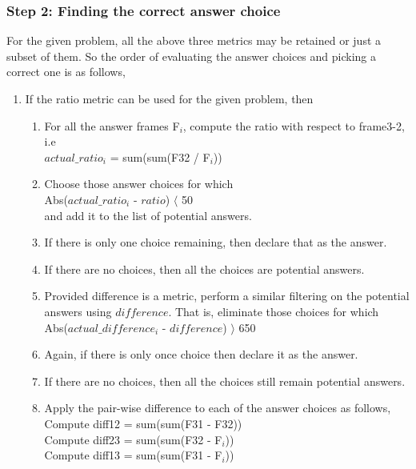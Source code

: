 \documentclass[10pt, letter]{article}
\begin{document}
\subsubsection*{Step 2: Finding the correct answer choice}
For the given problem, all the above three metrics may be retained or just a subset of them. So the order of evaluating the answer choices and picking a correct one is as follows,
\begin{enumerate}
\item If the ratio metric can be used for the given problem, then
	\begin{enumerate}
		\item For all the answer frames F$_i$, compute the ratio with respect to frame3-2, i.e \\
		\hspace*{3cm} $actual\_ratio_i$ = sum(sum(F32 / F$_i$)) 
		\item Choose those answer choices for which \\
		\hspace*{3cm} Abs($actual\_ratio_i$ - $ratio$) $\langle$ 50\\
		and add it to the list of potential answers.
		\item If there is only one choice remaining, then declare that as the answer.
		\item If there are no choices, then all the choices are potential answers.
		\item Provided difference is a metric, perform a similar filtering on the potential answers using $difference$. That is, eliminate those choices for which \\
		\hspace*{3cm} Abs($actual\_difference_i$ - $difference$) $\rangle$ 650
		\item Again, if there is only once choice then declare it as the answer.
		\item If there are no choices, then all the choices still remain potential answers.
		\item Apply the pair-wise difference to each of the answer choices as follows, \\
		\hspace*{3cm} Compute diff12 = sum(sum(F31 - F32)) \\
		\hspace*{3cm} Compute diff23 = sum(sum(F32 - F$_i$)) \\
		\hspace*{3cm} Compute diff13 = sum(sum(F31 - F$_i$)) \\		

\end{enumerate}
\end{enumerate}
\end{document}
